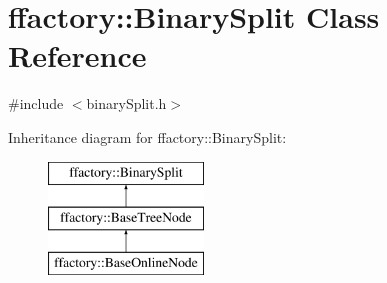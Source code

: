 \hypertarget{classffactory_1_1_binary_split}{\section{ffactory\-:\-:Binary\-Split Class Reference}
\label{classffactory_1_1_binary_split}
}


{\ttfamily \#include $<$binary\-Split.\-h$>$}

Inheritance diagram for ffactory\-:\-:Binary\-Split\-:\begin{figure}[H]
\begin{center}
\leavevmode
\includegraphics[height=3.000000cm]{classffactory_1_1_binary_split}
\end{center}
\end{figure}
